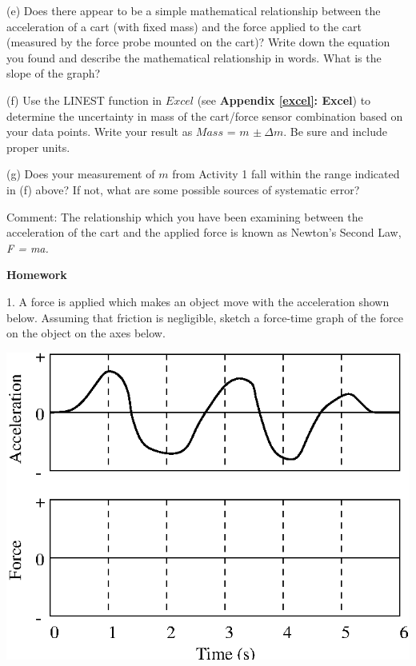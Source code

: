 (e) Does there appear to be a simple mathematical relationship between the acceleration of a cart (with fixed mass) and the force applied to the cart (measured by the force probe mounted on the cart)? Write down the equation you found and describe the mathematical relationship in words.  What is the slope of the graph?
\answerspace{20mm}

(f) Use the LINEST function in $Excel$ (see \textbf{Appendix \ref{excel}: Excel}) to determine the uncertainty in mass of the cart/force sensor combination based on your data points.  Write your result as $Mass$ = $m$ \( \pm \ \Delta  m\). Be sure and include proper units.
\answerspace{20mm}

(g) Does your measurement of $m$ from Activity 1 fall within the range indicated in (f) above? If not, what are some possible sources of systematic error?
\answerspace{20mm}

Comment: The relationship which you have been examining between the acceleration of the cart and the applied force is known as Newton's Second Law, \textit{F = ma.}

\pagebreak[2]
\textbf{Homework} 

1. A force is applied which makes an object move with the acceleration shown
below. Assuming that friction is negligible, sketch a force-time graph of the
force on the object on the axes below.

\vspace{0.3cm}
{\par\centering \includegraphics{force1/force1_fig6.eps} \par}
\vspace{0.3cm}

